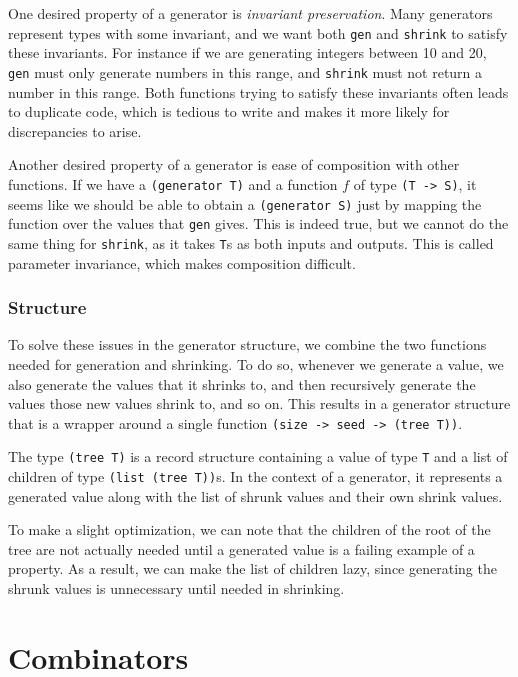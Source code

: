 \documentclass{scrartcl}
\begin{document}
One desired property of a generator is \emph{invariant preservation}.
Many generators represent types with some invariant,
and we want both \verb|gen| and \verb|shrink| to satisfy these invariants.
For instance if we are generating integers between 10 and 20,
\verb|gen| must only generate numbers in this range,
and \verb|shrink| must not return a number in this range.
Both functions trying to satisfy these invariants
often leads to duplicate code, which is tedious to write and
makes it more likely for discrepancies to arise.

Another desired property of a generator is
ease of composition with other functions.
If we have a \verb|(generator T)| and a function \(f\) of type \verb|(T -> S)|,
it seems like we should be able to obtain a \verb|(generator S)| just by
mapping the function over the values that \verb|gen| gives.
This is indeed true, but we cannot do the same thing for \verb|shrink|,
as it takes \verb|T|s as both inputs and outputs.
This is called parameter invariance, which makes composition difficult.

\subsubsection{Structure}
To solve these issues in the generator structure,
we combine the two functions needed for generation and shrinking.
To do so, whenever we generate a value,
we also generate the values that it shrinks to,
and then recursively generate the values those new values shrink to, and so on.
This results in a generator structure that is a wrapper around a single
function \verb|(size -> seed -> (tree T))|.

The type \verb|(tree T)| is a record structure containing
  a value of type \verb|T| and
  a list of children of type \verb|(list (tree T))|s.
In the context of a generator, it represents
  a generated value
  along with the list of shrunk values and their own shrink values.
  
To make a slight optimization, we can note that the children of the root
of the tree are not actually needed until a generated value is
a failing example of a property.
As a result, we can make the list of children lazy,
since generating the shrunk values is unnecessary until needed in shrinking.


\section{Combinators}
\end{document}
